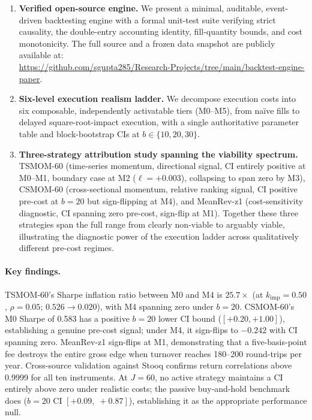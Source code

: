 \documentclass[12pt]{article}
\newcommand{\kimp}{k_{\mathrm{imp}}}
\begin{document}
\begin{enumerate}[nosep]
  \item \textbf{Verified open-source engine.} We present a minimal,
    auditable, event-driven backtesting engine with a formal unit-test
    suite verifying strict causality, the double-entry accounting
    identity, fill-quantity bounds, and cost monotonicity. The full
    source and a frozen data snapshot are publicly available at:\\
    \url{https://github.com/sgupta285/Research-Projects/tree/main/backtest-engine-paper}.

  \item \textbf{Six-level execution realism ladder.} We decompose
    execution costs into six composable, independently activatable
    tiers (M0--M5), from na\"{i}ve fills to delayed square-root-impact
    execution, with a single authoritative parameter table and
    block-bootstrap CIs at $b \in \{10, 20, 30\}$.

  \item \textbf{Three-strategy attribution study spanning the
    viability spectrum.} TSMOM-60 (time-series momentum, directional
    signal, CI entirely positive at M0--M1, boundary case at M2
    ($\ell = +0.003$), collapsing to span zero by M3), CSMOM-60 (cross-sectional momentum, relative ranking signal,
    CI positive pre-cost at $b = 20$ but sign-flipping at M4), and
    MeanRev-z1 (cost-sensitivity diagnostic, CI spanning zero pre-cost,
    sign-flip at M1). Together these three
    strategies span the full range from clearly non-viable to arguably
    viable, illustrating the diagnostic power of the execution ladder
    across qualitatively different pre-cost regimes.
\end{enumerate}

\paragraph{Key findings.}
TSMOM-60's Sharpe inflation ratio between M0 and M4 is $25.7\times$
(at $\kimp=0.50$, $\rho=0.05$; $0.526 \to 0.020$), with M4 spanning
zero under $b = 20$.
CSMOM-60's M0 Sharpe of 0.583 has a positive $b = 20$ lower CI bound
($[+0.20, +1.00]$), establishing a genuine pre-cost signal; under M4,
it sign-flips to $-0.242$ with CI spanning zero. MeanRev-z1 sign-flips at M1,
demonstrating that a five-basis-point fee destroys the entire gross
edge when turnover reaches 180--200 round-trips per year.
Cross-source validation against Stooq confirms return correlations
above 0.9999 for all ten instruments. At $J=60$, no active strategy
maintains a CI entirely above zero under realistic costs; the passive
buy-and-hold benchmark does
($b = 20$ CI $[+0.09,\;+0.87]$), establishing it as the
appropriate performance null.
\end{document}
